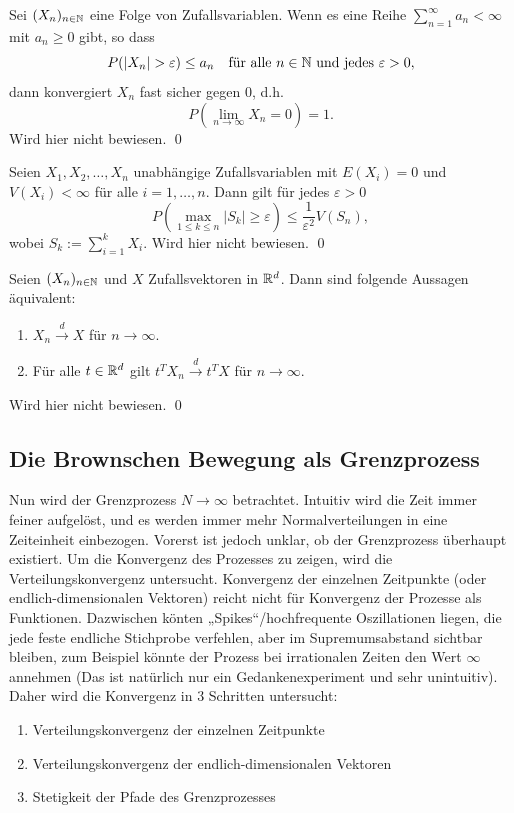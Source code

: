 \begin{lemma}
Sei $(X_n)_{n \in \Bbb N}$ eine Folge von Zufallsvariablen. Wenn es eine Reihe $\sum_{n=1}^\infty a_n \lt \infty$ mit $a_n \geq 0$ gibt, so dass
$$P(|X_n| > \varepsilon) \leq a_n \quad \text{für alle } n \in \Bbb N \text{ und jedes } \varepsilon > 0,$$
dann konvergiert $X_n$ fast sicher gegen $0$, d.h.
$$P\left(\lim_{n \to \infty} X_n = 0\right) = 1.$$
Wird hier nicht bewiesen. \qed
\end{lemma}

\begin{satz}
Seien $X_1, X_2, \ldots, X_n$ unabhängige Zufallsvariablen mit $E(X_i) = 0$ und $V(X_i) < \infty$ für alle $i=1, \ldots, n$. Dann gilt für jedes $\varepsilon > 0$
$$P\left(\max_{1 \leq k \leq n} |S_k| \geq \varepsilon \right) \leq \frac{1}{\varepsilon^2} V(S_n),$$
wobei $S_k := \sum_{i=1}^k X_i$. Wird hier nicht bewiesen. \qed
\end{satz}

\begin{satz}
Seien $(X_n)_{n \in \Bbb N}$ und $X$ Zufallsvektoren in $\Bbb R^d$. Dann sind folgende Aussagen äquivalent:
\begin{enumerate}
    \item $X_n \xrightarrow{d} X$ für $n \to \infty$.
    \item Für alle $t \in \Bbb R^d$ gilt $t^T X_n \xrightarrow{d} t^T X$ für $n \to \infty$.
\end{enumerate}
Wird hier nicht bewiesen. \qed
\end{satz}

\subsection{Die Brownschen Bewegung als Grenzprozess}
Nun wird der Grenzprozess $N \to \infty$ betrachtet. Intuitiv wird die Zeit immer feiner aufgelöst,
und es werden immer mehr Normalverteilungen in eine Zeiteinheit einbezogen. Vorerst ist jedoch unklar, 
ob der Grenzprozess überhaupt existiert. Um die Konvergenz des Prozesses zu zeigen, wird die Verteilungskonvergenz 
untersucht. Konvergenz der einzelnen Zeitpunkte (oder endlich-dimensionalen Vektoren) reicht nicht 
für Konvergenz der Prozesse als Funktionen. Dazwischen könten „Spikes“/hochfrequente Oszillationen liegen,
die jede feste endliche Stichprobe verfehlen, aber im Supremumsabstand sichtbar bleiben, zum Beispiel könnte der
Prozess bei irrationalen Zeiten den Wert $\infty$ annehmen (Das ist natürlich nur ein Gedankenexperiment und 
sehr unintuitiv). Daher wird die Konvergenz in 3 Schritten untersucht:
\begin{enumerate}
  \item Verteilungskonvergenz der einzelnen Zeitpunkte
  \item Verteilungskonvergenz der endlich-dimensionalen Vektoren
  \item Stetigkeit der Pfade des Grenzprozesses
\end{enumerate}

